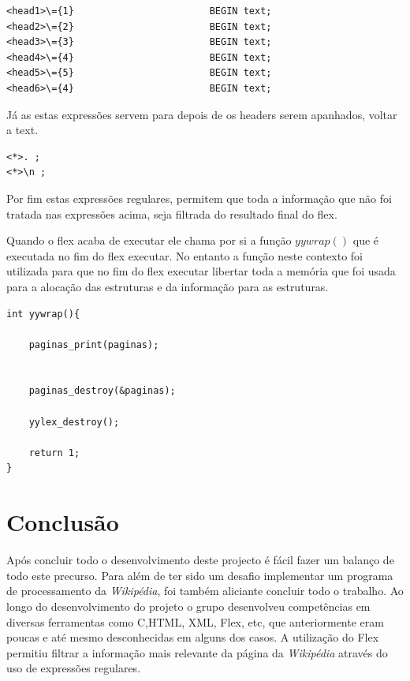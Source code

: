 \documentclass[11pt, a4paper, oneside]{article}
\begin{document}
\begin{verbatim}
<head1>\={1}                        BEGIN text;
<head2>\={2}                        BEGIN text;
<head3>\={3}                        BEGIN text;
<head4>\={4}                        BEGIN text;
<head5>\={5}                        BEGIN text;
<head6>\={4}                        BEGIN text;

\end{verbatim}
Já as estas expressões servem para depois de os headers serem apanhados, voltar a text.

\begin{verbatim}
<*>. ;
<*>\n ;
\end{verbatim}

Por fim estas expressões regulares, permitem que toda a informação que não foi tratada nas expressões acima, seja filtrada do resultado final do flex.

Quando o flex acaba de executar ele chama por si a função \begin{math} yywrap()\end{math} que é executada no fim do flex executar.
No entanto a função neste contexto foi utilizada para que no fim do flex executar libertar toda a memória que foi usada para a alocação das estruturas e da informação para as estruturas.

\begin{verbatim}
int yywrap(){

    paginas_print(paginas);

 
    paginas_destroy(&paginas);
    
    yylex_destroy();

    return 1;
}
\end{verbatim}



\newpage
\section{Conclusão}

Após concluir todo o desenvolvimento deste projecto é fácil fazer um balanço de todo este precurso. Para além de ter sido um desafio implementar um programa de processamento da \textit{Wikipédia}, foi também aliciante concluir todo o trabalho.
Ao longo do desenvolvimento do projeto o grupo desenvolveu competências em diversas ferramentas como C,HTML, XML, Flex, etc, que anteriormente eram poucas e até mesmo desconhecidas em alguns dos casos. 
A utilização do Flex permitiu filtrar a informação mais relevante da página da \textit{Wikipédia} através do uso de expressões regulares. 
\newpage
\end{document}

